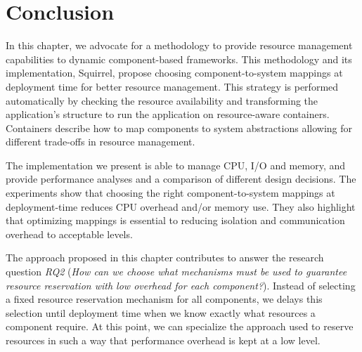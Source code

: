 
\section{Conclusion} \label{sec:squirrel-conclusions}


In this chapter, we advocate for a methodology to provide resource management capabilities to dynamic component-based frameworks.
This methodology and its implementation, Squirrel, propose choosing component-to-system mappings at deployment time for better resource management.
This strategy is performed automatically by checking the resource availability and transforming the application's structure to run the application on resource-aware containers.
Containers describe how to map components to system abstractions
allowing for different trade-offs in resource management.

The implementation we present is able to manage CPU, I/O and memory, and provide performance analyses and a comparison of different design decisions.
The experiments show that choosing the right component-to-system mappings at deployment-time reduces CPU overhead and/or memory use.
They also highlight that optimizing mappings is essential to reducing isolation and communication overhead to acceptable levels.

The approach proposed in this chapter contributes to answer the research question \textit{RQ2} (\textit{How can we choose what mechanisms must be used to guarantee resource reservation with low overhead for each component?}).
Instead of selecting a fixed resource reservation mechanism for all components, we delays this selection until deployment time when we know exactly what resources a component require.
At this point, we can specialize the approach used to reserve resources in such a way that performance overhead is kept at a low level.


